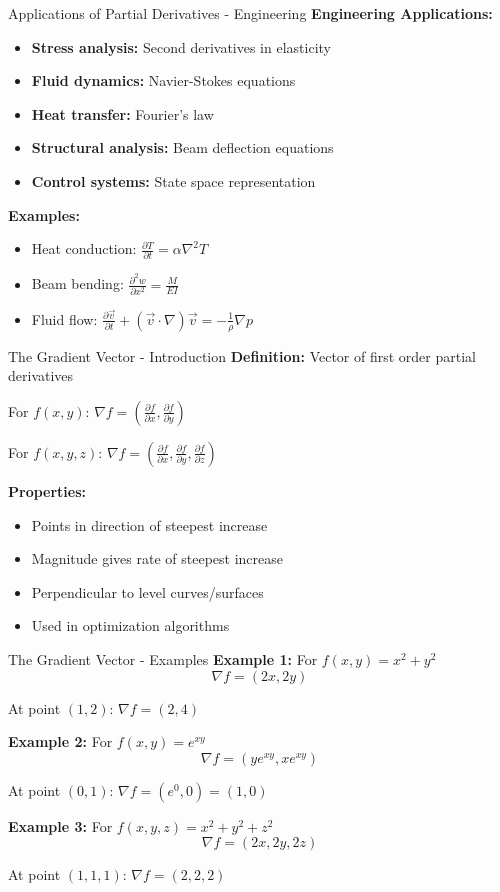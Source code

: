 \documentclass[aspectratio=169]{beamer}
\begin{document}
\begin{frame}{Applications of Partial Derivatives - Engineering}
\textbf{Engineering Applications:}
\begin{itemize}
    \item \textbf{Stress analysis:} Second derivatives in elasticity
    \item \textbf{Fluid dynamics:} Navier-Stokes equations
    \item \textbf{Heat transfer:} Fourier's law
    \item \textbf{Structural analysis:} Beam deflection equations
    \item \textbf{Control systems:} State space representation
\end{itemize}

\textbf{Examples:}
\begin{itemize}
    \item Heat conduction: $\frac{\partial T}{\partial t} = \alpha \nabla^2 T$
    \item Beam bending: $\frac{\partial^2 w}{\partial x^2} = \frac{M}{EI}$
    \item Fluid flow: $\frac{\partial \vec{v}}{\partial t} + (\vec{v} \cdot \nabla)\vec{v} = -\frac{1}{\rho}\nabla p$
\end{itemize}
\end{frame}

\begin{frame}{The Gradient Vector - Introduction}
\textbf{Definition:} Vector of first order partial derivatives

For $f(x,y)$: $\nabla f = \left(\frac{\partial f}{\partial x}, \frac{\partial f}{\partial y}\right)$

For $f(x,y,z)$: $\nabla f = \left(\frac{\partial f}{\partial x}, \frac{\partial f}{\partial y}, \frac{\partial f}{\partial z}\right)$

\textbf{Properties:}
\begin{itemize}
    \item Points in direction of steepest increase
    \item Magnitude gives rate of steepest increase
    \item Perpendicular to level curves/surfaces
    \item Used in optimization algorithms
\end{itemize}
\end{frame}

\begin{frame}{The Gradient Vector - Examples}
\textbf{Example 1:} For $f(x,y) = x^2 + y^2$
\[\nabla f = (2x, 2y)\]

At point $(1,2)$: $\nabla f = (2, 4)$

\textbf{Example 2:} For $f(x,y) = e^{xy}$
\[\nabla f = (ye^{xy}, xe^{xy})\]

At point $(0,1)$: $\nabla f = (e^0, 0) = (1, 0)$

\textbf{Example 3:} For $f(x,y,z) = x^2 + y^2 + z^2$
\[\nabla f = (2x, 2y, 2z)\]

At point $(1,1,1)$: $\nabla f = (2, 2, 2)$
\end{frame}
\end{document}
